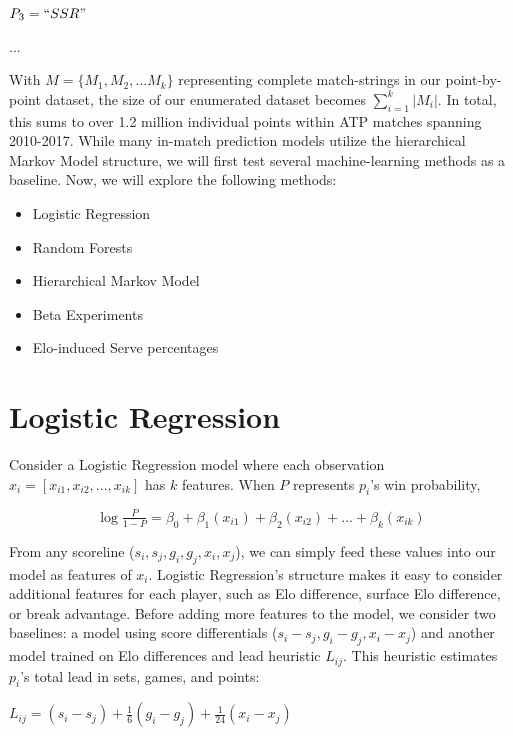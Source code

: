 \documentclass[chapterprefix=false]{report}
\begin{document}
$P_3 = ``SSR"$

...

With $M = \{M_1,M_2,...M_k\}$ representing complete match-strings in our point-by-point dataset, the size of our enumerated dataset becomes $\sum_{i=1}^k |M_i|$. In total, this sums to over 1.2 million individual points within ATP matches spanning 2010-2017. While many in-match prediction models utilize the hierarchical Markov Model structure, we will first test several machine-learning methods as a baseline. Now, we will explore the following methods:

\begin{itemize}
  \item Logistic Regression
  \item Random Forests
  \item Hierarchical Markov Model
  \item Beta Experiments 
  \item Elo-induced Serve percentages
\end{itemize}


\section{Logistic Regression}

Consider a Logistic Regression model where each observation $x_i = [x_{i1},x_{i2},...,x_{ik}]$ has $k$ features. When $P$ represents $p_i$'s win probability,

$$ \log{\tfrac{P}{1-P}} = \beta_0+\beta_1(x_{i1})+\beta_2(x_{i2})+...+\beta_k(x_{ik})$$


From any scoreline ($s_i,s_j,g_i,g_j,{x}_i,{x}_j$), we can simply feed these values into our model as features of $x_i$. Logistic Regression's structure makes it easy to consider additional features for each player, such as Elo difference, surface Elo difference, or break advantage. Before adding more features to the model, we consider two baselines: a model using score differentials ($s_i-s_j,g_i-g_j,{x}_i-{x}_j$) and another model trained on Elo differences and lead heuristic $L_{ij}$. This heuristic estimates $p_i$'s total lead in sets, games, and points:

\begin{center}
$L_{ij} = (s_i-s_j) + \frac{1}{6}(g_i-g_j) + \frac{1}{24}(x_i-x_j)$
\end{center}
\end{document}
